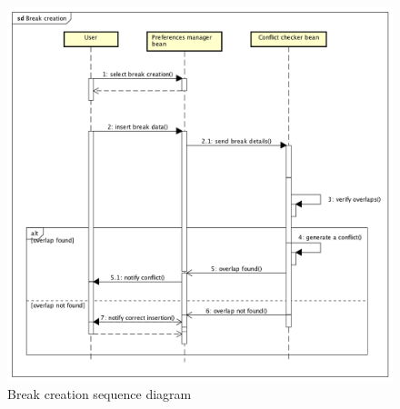 \begin{figure}
	\centering
	\includegraphics[width=1.3\textwidth]{images/breakcreation}
	\caption{Break creation sequence diagram}
	\label{fig:breakcreation}
\end{figure}
